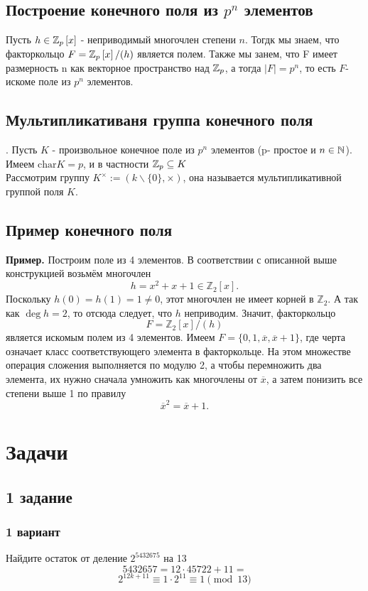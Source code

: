 \subsection{Построение конечного поля из $p^n$ элементов}
Пусть $h\in\mathbb{Z}_p\left[x\right]$ - неприводимый многочлен степени $n$. Тогдк мы знаем, что факторкольцо $F = \mathbb{Z}_p\left[x\right]/(h)$ является полем. Также мы занем, что F имеет размерность n как векторное пространство над $\mathbb{Z}_p$, а тогда $|F| = p^n$, то есть $F$- искоме поле из $p^n$ элементов. 
\subsection{Мультипликативаня группа конечного поля}.
Пусть $K$ - произвольное конечное поле из $p^n$ элементов (p- простое и $n\in\mathbb{N}$). Имеем $\text{char} K = p$, и в частности $\mathbb{Z}_p\subseteq K$\\
Рассмотрим группу $K^{\times} := (k\backslash\{0\}, \times)$, она называется мультипликативной группой поля $K$.
\subsection{Пример конечного поля}
\textbf{Пример.} Построим поле из 4 элементов. В соответствии с описанной выше конструкцией возьмём многочлен 
\[
h = x^2 + x + 1 \in \mathbb{Z}_2[x].
\]
Поскольку \( h(0) = h(1) = 1 \neq 0 \), этот многочлен не имеет корней в \(\mathbb{Z}_2\). А так как \(\deg h = 2\), то отсюда следует, что \( h \) неприводим. Значит, факторкольцо 
\[
F = \mathbb{Z}_2[x]/(h)
\]
является искомым полем из 4 элементов. Имеем \( F = \{0, 1, \overline{x}, \overline{x} + 1\} \), где черта означает класс соответствующего элемента в факторкольце. На этом множестве операция сложения выполняется по модулю 2, а чтобы перемножить два элемента, их нужно сначала умножить как многочлены от \(\overline{x}\), а затем понизить все степени выше 1 по правилу 
\[
\overline{x}^2 = \overline{x} + 1.
\]
\section{Задачи}
\subsection{1 задание }
\subsubsection{1 вариант}
Найдите остаток от деление $2^{5432675}$ на 13
$$5432657 = 12\cdot45722 + 11  =  $$
$$2^{12k +11} \equiv  1\cdot2^{11}\equiv 1\pmod{13} $$
